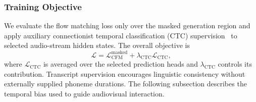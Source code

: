 \subsubsection{Training Objective}
\label{subsubsec:mmdit_alignment}
We evaluate the flow matching loss only over the masked generation region
and apply auxiliary connectionist temporal classification (CTC)
supervision~\cite{graves2006ctc,choi2025aligndit} to selected audio-stream
hidden states. The overall objective is
\begin{equation}
\mathcal{L}=\mathcal{L}_{\mathrm{CFM}}^{\mathrm{masked}}
+\lambda_{\mathrm{CTC}}\mathcal{L}_{\mathrm{CTC}},
\label{eq:mmdit_training_objective}
\end{equation}
where $\mathcal{L}_{\mathrm{CTC}}$ is averaged over the selected prediction
heads and $\lambda_{\mathrm{CTC}}$ controls its contribution. Transcript
supervision encourages linguistic consistency without externally supplied
phoneme durations. The following subsection describes the temporal bias
used to guide audiovisual interaction.

